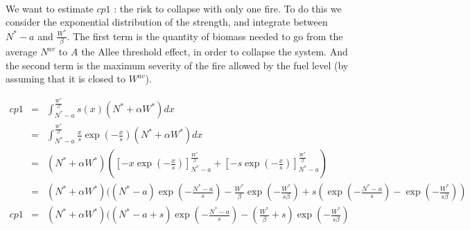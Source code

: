 \documentclass{article}
\begin{document}
\paragraph{}
We want to estimate $cp1$ : the risk to collapse with only one fire. To do this we consider the exponential distribution of the strength, and integrate between $N^*-a$ and $\frac{W^*}{\beta}$. The first term is the quantity of biomass needed to go from the average $N^{av}$ to $A$ the Allee threshold effect, in order to collapse the system. And the second term is the maximum severity of the fire allowed by the fuel level (by assuming that it is closed to $W^{av}$).

\[
\begin{array}{rcl}
cp1 &=& \int_{N^*-a}^{\frac{W^*}{\beta}}s(x)(N^*+\alpha W^*)dx \\
&=& \int_{N^*-a}^{\frac{W^*}{\beta}} \frac{x}{s}\exp(-\frac{x}{s})(N^*+\alpha W^*)dx \\
&=& (N^*+\alpha W^*)([-x\exp(-\frac{x}{s})]_{N^*-a}^{\frac{W^*}{\beta}} +  [ -s\exp(-\frac{x}{s})]_{N^*-a}^{\frac{W^*}{\beta}}) \\
&=& (N^*+\alpha W^*)((N^*-a)\exp(-\frac{N^*-a}{s}) - \frac{W^*}{\beta}\exp(-\frac{W^*}{s\beta}) + s(\exp(-\frac{N^*-a}{s})- \exp(-\frac{W^*}{s\beta})) \\
cp1 &=& (N^*+\alpha W^*)((N^*-a+s)\exp(-\frac{N^*-a}{s}) - (\frac{W^*}{\beta}+s)\exp(-\frac{W^*}{s\beta}) \\
\end{array}
\]






\end{document}
